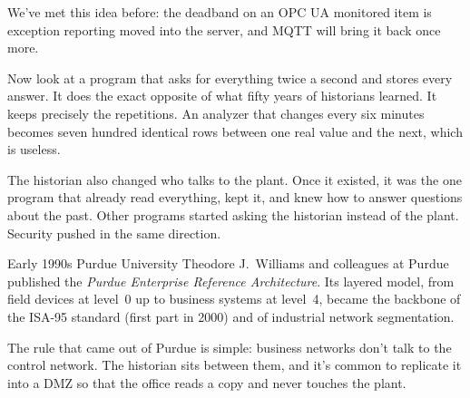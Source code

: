 We've met this idea before: the deadband on an OPC UA monitored item is
exception reporting moved into the server, and MQTT will bring it back once
more.

Now look at a program that asks for everything twice a second and stores every
answer. It does the exact opposite of what fifty years of historians learned. It
keeps precisely the repetitions. An analyzer that changes every six minutes
becomes seven hundred identical rows between one real value and the next, which
is useless.

The historian also changed who talks to the plant. Once it existed, it was the
one program that already read everything, kept it, and knew how to answer
questions about the past. Other programs started asking the historian instead of
the plant. Security pushed in the same direction.

\begin{history}{Early 1990s \textperiodcentered{} Purdue University}
Theodore J.\ Williams and colleagues at Purdue published the \emph{Purdue
Enterprise Reference Architecture}. Its layered model, from field devices at
level~0 up to business systems at level~4, became the backbone of the ISA-95
standard (first part in 2000) and of industrial network segmentation.
\end{history}

The rule that came out of Purdue is simple: business networks don't talk to the
control network. The historian sits between them, and it's common to replicate
it into a DMZ so that the office reads a copy and never touches the plant.

